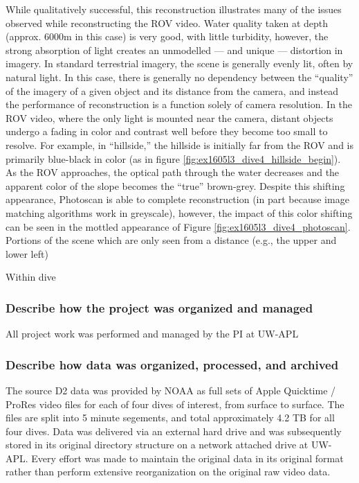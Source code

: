 \documentclass[letterpaper,12pt]{article}
\begin{document}
While qualitatively successful, this reconstruction illustrates many of the issues observed while reconstructing the ROV video.    Water quality taken at depth (approx. 6000m in this case) is very good, with little turbidity, however, the strong absorption of light creates an unmodelled --- and unique --- distortion in imagery.   In standard terrestrial imagery, the scene is generally evenly lit, often by natural light.   In this case, there is generally no dependency between the ``quality'' of the imagery of a given object and its distance from the camera, and instead the performance of reconstruction is a function solely of camera resolution.   In the ROV video, where the only light is mounted near the camera, distant objects undergo a fading in color and contrast well before they become too small to resolve.   For example, in ``hillside,'' the hillside is initially far from the ROV and is primarily blue-black in color (as in figure \ref{fig:ex1605l3_dive4_hillside_begin}).  As the ROV approaches, the optical path through the water decreases and the apparent color of the slope becomes the ``true'' brown-grey.   Despite this shifting appearance, Photoscan is able to complete reconstruction (in part because image matching algorithms work in greyscale), however, the impact of this color shifting can be seen in the mottled appearance of Figure \ref{fig:ex1605l3_dive4_photoscan}. 
Portions of the scene which are only seen from a distance (e.g., the upper and lower left)









Within dive 



\subsubsection*{Describe how the project was organized and managed}

All project work was performed and managed by the PI at UW-APL

\subsubsection*{Describe how data was organized, processed, and archived}

The source D2 data was provided by NOAA as full sets of Apple Quicktime / ProRes video files for each of four dives of interest, from surface to surface.   The files are split into 5 minute segements, and total approximately 4.2 TB for all four dives.   Data was delivered via an external hard drive and was subsequently stored in its original directory structure on a network attached drive at UW-APL.  Every effort was made to maintain the original data in its original format rather than perform extensive reorganization on the original raw video data.
\end{document}

